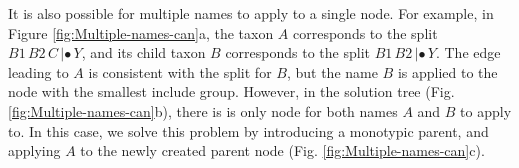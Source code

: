 \documentclass[english]{article}
\begin{document}
It is also possible for multiple names to apply to a single node.
For
example, in Figure \ref{fig:Multiple-names-can}a, the taxon $A$
corresponds to the split $B1\,B2\,C\,|\bullet\,Y$, and its child taxon
$B$ corresponds to the split $B1\,B2\,|\bullet\,Y$.
The edge leading
to $A$ is consistent with the split for $B$, but the name $B$ is
applied to the node with the smallest include group.
However, in the
solution tree (Fig.
\ref{fig:Multiple-names-can}b), there is is only
node for both names $A$ and $B$ to apply to.
In this case, we solve
this problem by introducing a monotypic parent, and applying $A$ to
the newly created parent node (Fig.
\ref{fig:Multiple-names-can}c).
\begin{figure}
\hfill{}
\hfill{}

\end{figure}
\end{document}

